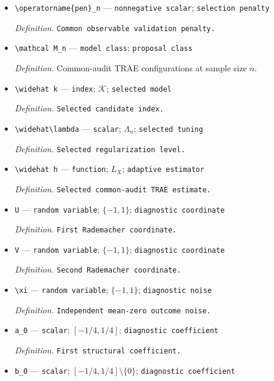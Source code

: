 \documentclass{article}
\begin{document}
\begin{itemize}
  \item \texttt{\textbackslash{}\allowbreak{}operatorname\{pen\}\allowbreak{}\_\allowbreak{}n} --- \texttt{nonnegative scalar}; \texttt{selection penalty}
  \par\smallskip\noindent\emph{Definition.} \texttt{Common observable validation penalty.}
  \item \texttt{\textbackslash{}\allowbreak{}mathcal M\_\allowbreak{}n} --- \texttt{model class}; \texttt{proposal class}
  \par\smallskip\noindent\emph{Definition.} Common-audit TRAE configurations at sample size \(n\).
  \item \texttt{\textbackslash{}\allowbreak{}widehat k} --- \texttt{index}; \(\mathcal K\); \texttt{selected model}
  \par\smallskip\noindent\emph{Definition.} \texttt{Selected candidate index.}
  \item \texttt{\textbackslash{}\allowbreak{}widehat\textbackslash{}\allowbreak{}lambda} --- \texttt{scalar}; \(\Lambda_n\); \texttt{selected tuning}
  \par\smallskip\noindent\emph{Definition.} \texttt{Selected regularization level.}
  \item \texttt{\textbackslash{}\allowbreak{}widehat h} --- \texttt{function}; \(L_X\); \texttt{adaptive estimator}
  \par\smallskip\noindent\emph{Definition.} \texttt{Selected common-\allowbreak{}audit TRAE estimate.}
  \item \texttt{U} --- \texttt{random variable}; \(\{-1,1\}\); \texttt{diagnostic coordinate}
  \par\smallskip\noindent\emph{Definition.} \texttt{First Rademacher coordinate.}
  \item \texttt{V} --- \texttt{random variable}; \(\{-1,1\}\); \texttt{diagnostic coordinate}
  \par\smallskip\noindent\emph{Definition.} \texttt{Second Rademacher coordinate.}
  \item \texttt{\textbackslash{}\allowbreak{}xi} --- \texttt{random variable}; \(\{-1,1\}\); \texttt{diagnostic noise}
  \par\smallskip\noindent\emph{Definition.} \texttt{Independent mean-\allowbreak{}zero outcome noise.}
  \item \texttt{a\_\allowbreak{}0} --- \texttt{scalar}; \([-1/4,1/4]\); \texttt{diagnostic coefficient}
  \par\smallskip\noindent\emph{Definition.} \texttt{First structural coefficient.}
  \item \texttt{b\_\allowbreak{}0} --- \texttt{scalar}; \([-1/4,1/4]\setminus\{0\}\); \texttt{diagnostic coefficient}

\end{itemize}
\end{document}
